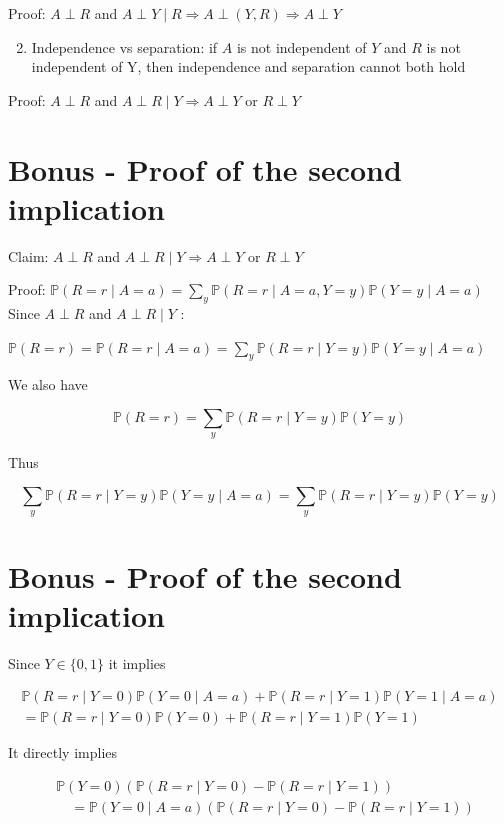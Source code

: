 \documentclass[10pt]{article}
\begin{document}
Proof: $A \perp R$ and $A \perp Y \mid R \Longrightarrow A \perp(Y, R) \Longrightarrow A \perp Y$

\begin{enumerate}
  \setcounter{enumi}{1}
  \item Independence vs separation: if $A$ is not independent of $Y$ and $R$ is not independent of $\mathrm{Y}$, then independence and separation cannot both hold
\end{enumerate}

Proof: $A \perp R$ and $A \perp R \mid Y \Longrightarrow A \perp Y$ or $R \perp Y$

\section*{Bonus - Proof of the second implication}
Claim: $A \perp R$ and $A \perp R \mid Y \Longrightarrow A \perp Y$ or $R \perp Y$

Proof: $\mathbb{P}(R=r \mid A=a)=\sum_{y} \mathbb{P}(R=r \mid A=a, Y=y) \mathbb{P}(Y=y \mid A=a)$ Since $A \perp R$ and $A \perp R \mid Y$ :

$\mathbb{P}(R=r)=\mathbb{P}(R=r \mid A=a)=\sum_{y} \mathbb{P}(R=r \mid Y=y) \mathbb{P}(Y=y \mid A=a)$

We also have

$$
\mathbb{P}(R=r)=\sum_{y} \mathbb{P}(R=r \mid Y=y) \mathbb{P}(Y=y)
$$

Thus

$$
\sum_{y} \mathbb{P}(R=r \mid Y=y) \mathbb{P}(Y=y \mid A=a)=\sum_{y} \mathbb{P}(R=r \mid Y=y) \mathbb{P}(Y=y)
$$

\section*{Bonus - Proof of the second implication}
Since $Y \in\{0,1\}$ it implies

$$
\begin{array}{r}
\mathbb{P}(R=r \mid Y=0) \mathbb{P}(Y=0 \mid A=a)+\mathbb{P}(R=r \mid Y=1) \mathbb{P}(Y=1 \mid A=a) \\
=\mathbb{P}(R=r \mid Y=0) \mathbb{P}(Y=0)+\mathbb{P}(R=r \mid Y=1) \mathbb{P}(Y=1)
\end{array}
$$

It directly implies

$$
\begin{aligned}
& \mathbb{P}(Y=0)(\mathbb{P}(R=r \mid Y=0)-\mathbb{P}(R=r \mid Y=1)) \\
& \quad=\mathbb{P}(Y=0 \mid A=a)(\mathbb{P}(R=r \mid Y=0)-\mathbb{P}(R=r \mid Y=1))
\end{aligned}
$$
\end{document}
